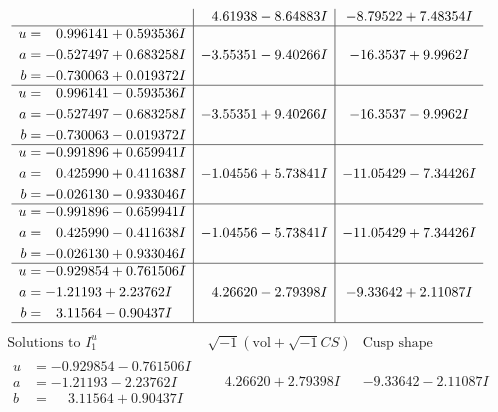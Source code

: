 \documentclass[1p]{elsarticle_modified}
\theoremstyle{definition}
\newcommand{\I}{\sqrt{-1}}
\begin{document}
$$\begin{array}{c|c|c}
 & \phantom{-}4.61938 - 8.64883 I & -8.79522 + 7.48354 I \\ \hline\begin{aligned}
u &= \phantom{-}0.996141 + 0.593536 I \\
a &= -0.527497 + 0.683258 I \\
b &= -0.730063 + 0.019372 I\end{aligned}
 & -3.55351 - 9.40266 I & -16.3537 + 9.9962 I \\ \hline\begin{aligned}
u &= \phantom{-}0.996141 - 0.593536 I \\
a &= -0.527497 - 0.683258 I \\
b &= -0.730063 - 0.019372 I\end{aligned}
 & -3.55351 + 9.40266 I & -16.3537 - 9.9962 I \\ \hline\begin{aligned}
u &= -0.991896 + 0.659941 I \\
a &= \phantom{-}0.425990 + 0.411638 I \\
b &= -0.026130 - 0.933046 I\end{aligned}
 & -1.04556 + 5.73841 I & -11.05429 - 7.34426 I \\ \hline\begin{aligned}
u &= -0.991896 - 0.659941 I \\
a &= \phantom{-}0.425990 - 0.411638 I \\
b &= -0.026130 + 0.933046 I\end{aligned}
 & -1.04556 - 5.73841 I & -11.05429 + 7.34426 I \\ \hline\begin{aligned}
u &= -0.929854 + 0.761506 I \\
a &= -1.21193 + 2.23762 I \\
b &= \phantom{-}3.11564 - 0.90437 I\end{aligned}
 & \phantom{-}4.26620 - 2.79398 I & -9.33642 + 2.11087 I\\
 \hline 
 \end{array}$$\newpage$$\begin{array}{c|c|c}  
\text{Solutions to }I^u_{1}& \I (\text{vol} + \sqrt{-1}CS) & \text{Cusp shape}\\
 \hline 
\begin{aligned}
u &= -0.929854 - 0.761506 I \\
a &= -1.21193 - 2.23762 I \\
b &= \phantom{-}3.11564 + 0.90437 I\end{aligned}
 & \phantom{-}4.26620 + 2.79398 I & -9.33642 - 2.11087 I \\ \hline\begin{aligned}

\end{aligned}
\end{array}$$
\end{document}
